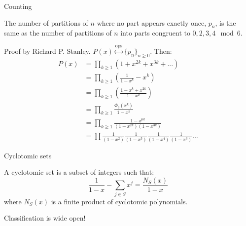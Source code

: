 \documentclass[]{beamer}
\newcommand{\ops}{\overset{\text{ops}}{\leftrightarrow}}
\begin{document}
\begin{frame}[allowframebreaks]{Counting}
	\begin{theorem}[Schur, 1926]
		The number of partitions of $n$ where no part appears exactly once, $p_n$, is the same as the number of partitions of $n$ into parts congruent to $0, 2, 3, 4 \mod 6$. 
	\end{theorem}
		Proof by Richard P. Stanley.
		$P(x) \ops \lbrace p_n \rbrace_{n \geq 0}$.
		Then:
		\begin{align*}
			P(x) &= \prod_{k \geq 1}(1 + x^{2k} + x^{3k} + ...)\\
			&= \prod_{k \geq 1}\left(\frac{1}{1-x^k} - x^k\right)\\
			&= \prod_{k \geq 1} \left(\frac{1 - x^k + x^{2k}}{1-x^k}\right)\\
			&= \prod_{k \geq 1} \frac{\Phi_6(x^k)}{1-x^k}\\
			&= \prod_{k \geq 1} \frac{1 - x^{6k}}{(1 - x^{2k})(1 - x^{3k})}\\
			&= \prod \frac{1}{(1 - x^{2})}\frac{1}{(1 - x^{3})}\frac{1}{(1 - x^{4})}\frac{1}{(1 - x^{6})}...
		\end{align*}
\end{frame}

\begin{frame}{Cyclotomic sets}
	\begin{definition}
		A cyclotomic set is a subset of integers such that:
		\begin{equation}
			\frac{1}{1-x} - \sum_{j \in S} x^j = \frac{N_S(x)}{1-x}
		\end{equation}
		where $N_S(x)$ is a finite product of cyclotomic polynomials.
	\end{definition}
	Classification is wide open!
\end{frame}
\end{document}
